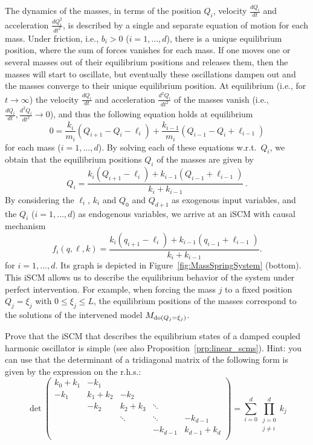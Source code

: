 \begin{Eg}
The dynamics of the masses, in terms of the position $Q_i$, velocity $\frac{dQ_i}{dt}$ and acceleration $\frac{dQ_i^2}{dt^2}$, is described by a single and separate equation of motion for each mass. Under friction, i.e., $b_i>0$ ($i=1,\dots,d$), there is a unique equilibrium position, where the sum of forces vanishes for each mass. If one moves one or several masses out of their equilibrium positions and releases them, then the masses will start to oscillate, but eventually these oscillations dampen out and the masses converge to their unique equilibrium position. At equilibrium (i.e., for $t\to\infty$) the velocity $\frac{dQ_i}{dt}$ and acceleration $\frac{d^2Q_i}{dt^2}$ of the masses vanish (i.e., $\frac{dQ_i}{dt},\frac{d^2Q_i}{dt^2}\to 0$), and thus the following equation holds at equilibrium
$$
  0 = \frac{k_i}{m_i} (Q_{i+1} - Q_i - \ell_i) + \frac{k_{i-1}}{m_i} (Q_{i-1} - Q_i + \ell_{i-1})
$$
for each mass ($i=1,\dots,d$). By solving each of these equations w.r.t.\ $Q_i$, we obtain that the equilibrium positions $Q_i$ of the masses are given by
$$
  Q_i = \frac{k_i(Q_{i+1} - \ell_i) + k_{i-1}(Q_{i-1}+\ell_{i-1})}{k_i + k_{i-1}}\,.
$$
By considering the $\ell_i$, $k_i$ and $Q_0$ and $Q_{d+1}$ as exogenous input variables, and the
$Q_i$ ($i=1,\dots,d$) as endogenous variables, we arrive at an iSCM with causal mechanism
$$
f_i(q,\ell,k) = \frac{k_i(q_{i+1} - \ell_i) + k_{i-1}(q_{i-1}+\ell_{i-1})}{k_i + k_{i-1}}.
$$
for $i=1,\dots,d$.
Its graph is depicted in Figure~\ref{fig:MassSpringSystem} (bottom). This iSCM allows us to describe the equilibrium behavior of the system under perfect intervention. For example, when forcing the mass $j$ to a fixed position $Q_j=\xi_j$ with $0\leq \xi_j\leq L$, the equilibrium positions of the masses correspond to the solutions of the intervened model $M_{\operatorname{do}(Q_j=\xi_j)}$. 
\end{Eg}
\begin{Exc}
Prove that the iSCM that describes the equilibrium states of a damped coupled harmonic oscillator is simple
(see also Proposition~\ref{prp:linear_scms}). Hint: you can use that the determinant of a tridiagonal matrix of the following
form is given by the expression on the r.h.s.:
  $$\det \begin{pmatrix}
    k_0+k_1 & -k_1       &           &         & \\
    -k_1     & k_1 + k_2 & -k_2       &         & \\
            & -k_2       & k_2 + k_3 & \ddots  & \\
            &           & \ddots    & \ddots  & -k_{d-1} \\
            &           &           & -k_{d-1} & k_{d-1} + k_d \\
  \end{pmatrix} = \sum_{i=0}^d \prod_{\substack{j=0 \\ j\ne i}}^d k_j
  $$
\end{Exc}

